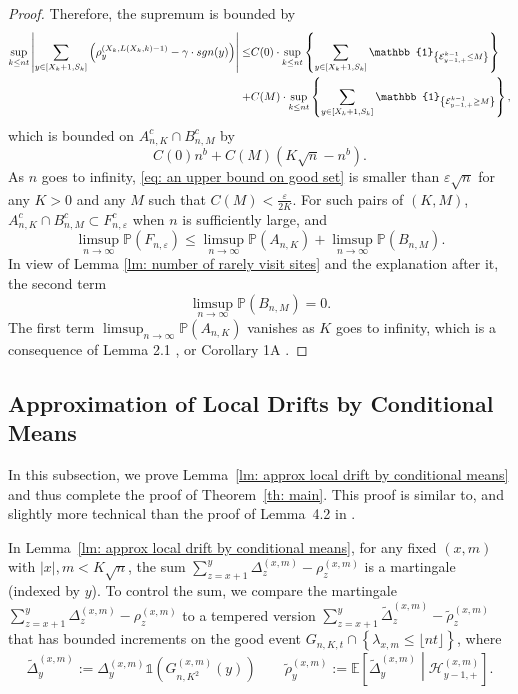 \documentclass[EJP]{ejpecp} %
\newcommand{\abs}[1]{\left\vert #1 \right\vert}
\begin{document}
\begin{proof}
	Therefore, the supremum is bounded by
	\begin{align*}
		\sup_{k\leq n t}  \abs{  	\sum_{y\in [X_{k}+1 ,S_k]} \left( \rho^{(X_k,L(X_k,k)-1)}_y -  \gamma \cdot sgn(y) \right) } \leq &  
		C(0) \cdot \sup_{k\leq n t} \left\{   	\sum_{y\in [X_{k}+1 ,S_k]} \mathbb{1}_{ \left\{ \mathcal{E}^{k-1}_{y-1,+} \leq M \right\} } \right\}
		\notag
		\\
		+& C(M) \cdot \sup_{k\leq n t} \left\{   	\sum_{y\in [X_{k}+1 ,S_k]} \mathbb{1}_{ \left\{ \mathcal{E}^{k-1}_{y-1,+} \geq M \right\} } \right\},
	\end{align*} which is bounded on $A^c_{n,K} \cap B^c_{n,M}$ by
	\begin{equation}\label{eq: an upper bound on good set}
		C(0)n^b  + C(M) \left(K \sqrt{n} -n^b\right).
	\end{equation} 
	As $n$ goes to infinity, \eqref{eq: an upper bound on good set} is smaller than $\varepsilon \sqrt{n}$ for any $K>0$ and any $M$ such that $C(M) < \frac{\varepsilon}{2K}$. 
	For such pairs of $(K,M)$, $A^c_{n,K} \cap B^c_{n,M} \subset F^c_{n,\varepsilon}$ when $n$ is sufficiently large, and 
	\[
	\limsup_{n\to \infty} \mathbb{P}(F_{n,\varepsilon}) \leq \limsup_{n\to \infty}  \mathbb{P}(A_{n,K}) +  \limsup_{n\to \infty}  \mathbb{P}(B_{n,M}).
	\]
	In view of Lemma \ref{lm: number of rarely visit sites} and the explanation after it, the second term $$\limsup_{n\to \infty}  \mathbb{P}(B_{n,M})=0.$$  The first term $\limsup_{n\to \infty}  \mathbb{P}(A_{n,K}) $ vanishes as $K$ goes to infinity, which is a consequence of Lemma 2.1 \cite{KMP23}, or Corollary 1A \cite{T96}.
\end{proof}


\subsection{Approximation of Local Drifts by Conditional Means}
\label{sec:DeltaRho}
In this subsection, we prove Lemma~\ref{lm: approx local drift by conditional means} and thus complete the proof of Theorem~\ref{th: main}. This proof is similar to, and slightly more technical than the proof of {Lemma~4.2} in \cite{KP16}. 

In Lemma~\ref{lm: approx local drift by conditional means}, for any fixed $(x,m)$ with $\abs{x},m < K\sqrt{n}$, the sum $\sum_{z=x+1}^{y}  \Delta_z^{(x,m)} - \rho_z^{(x,m)}  $ is a martingale (indexed by $y$). To control the sum, we compare the martingale $\sum_{z=x+1}^{y} \Delta_z^{(x,m)} - \rho_z^{(x,m)}$ to a tempered version $\sum_{z= x+1}^y \tilde \Delta_{z}^{(x,m)} - \tilde\rho_z^{(x,m)}$ that has bounded increments on the good event $G_{n, K, t} \cap \left\{\lambda_{x,m} \leq\lfloor nt \rfloor \right\}$, where
\[
\tilde \Delta_y^{(x,m)} := \Delta_y ^{(x,m)} \mathbb{1}\left( G_{n, K^2}^{(x,m)} (y)\right) \qquad
\tilde \rho_y^{(x,m)} := \mathbb{E}\left[ \tilde\Delta_y^{(x,m)} \middle| \mathcal{H}_{y-1, +}^{(x,m)} \right]  
.\] 
\end{document}
